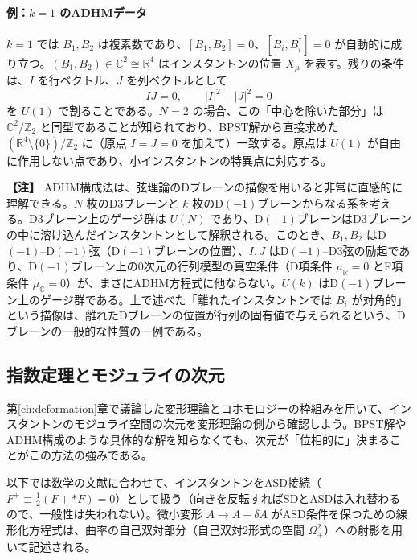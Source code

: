 \documentclass[uplatex, dvipdfmx, book]{jsbook}
\let\origsubsection\subsection
\let\origsubsubsection\subsubsection
\renewcommand{\section}{\origsubsection}
\renewcommand{\subsection}{\origsubsubsection}
\renewcommand{\subsubsection}{\paragraph}
\newenvironment{note}{\vspace{1ex}\par\footnotesize\noindent\textbf{【注】}}{\par\vspace{1ex}}
\begin{document}
\paragraph{例：$k = 1$ のADHMデータ}
$k = 1$ では $B_1, B_2$ は複素数であり、$[B_1, B_2] = 0$、$[B_i, B_i^\dagger] = 0$ が自動的に成り立つ。$(B_1, B_2) \in \mathbb{C}^2 \cong \mathbb{R}^4$ はインスタントンの位置 $X_\mu$ を表す。残りの条件は、$I$ を行ベクトル、$J$ を列ベクトルとして
\begin{equation}
    IJ = 0, \qquad |I|^2 - |J|^2 = 0
\end{equation}
を $U(1)$ で割ることである。$N = 2$ の場合、この「中心を除いた部分」は $\mathbb{C}^2/\mathbb{Z}_2$ と同型であることが知られており、BPST解から直接求めた $(\mathbb{R}^4 \setminus \{0\})/\mathbb{Z}_2$ に（原点 $I = J = 0$ を加えて）一致する。原点は $U(1)$ が自由に作用しない点であり、小インスタントンの特異点に対応する。

\begin{note}
ADHM構成法は、弦理論のDブレーンの描像を用いると非常に直感的に理解できる。$N$ 枚のD3ブレーンと $k$ 枚のD$(-1)$ブレーンからなる系を考える。D3ブレーン上のゲージ群は $U(N)$ であり、D$(-1)$ブレーンはD3ブレーンの中に溶け込んだインスタントンとして解釈される。このとき、$B_1, B_2$ はD$(-1)$--D$(-1)$弦（D$(-1)$ブレーンの位置）、$I, J$ はD$(-1)$--D3弦の励起であり、D$(-1)$ブレーン上の0次元の行列模型の真空条件（D項条件 $\mu_{\mathbb{R}} = 0$ とF項条件 $\mu_{\mathbb{C}} = 0$）が、まさにADHM方程式に他ならない。$U(k)$ はD$(-1)$ブレーン上のゲージ群である。上で述べた「離れたインスタントンでは $B_i$ が対角的」という描像は、離れたDブレーンの位置が行列の固有値で与えられるという、Dブレーンの一般的な性質の一例である。
\end{note}

\section{指数定理とモジュライの次元}
\label{sec:index}

第\ref{ch:deformation}章で議論した変形理論とコホモロジーの枠組みを用いて、インスタントンのモジュライ空間の次元を変形理論の側から確認しよう。BPST解やADHM構成のような具体的な解を知らなくても、次元が「位相的に」決まることがこの方法の強みである。

以下では数学の文献に合わせて、インスタントンをASD接続（$F^+ \equiv \frac{1}{2}(F + *F) = 0$）として扱う（向きを反転すればSDとASDは入れ替わるので、一般性は失われない）。微小変形 $A \to A + \delta A$ がASD条件を保つための線形化方程式は、曲率の自己双対部分（自己双対2形式の空間 $\Omega^2_+$）への射影を用いて記述される。
\end{document}
